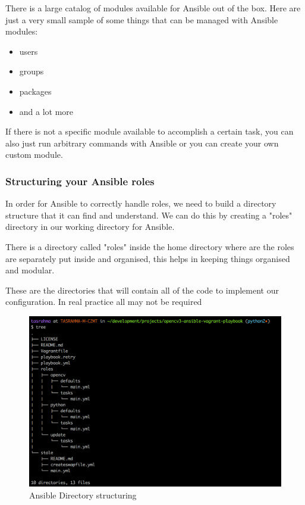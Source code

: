 \documentclass[BTech]{srmuthesis}
\begin{document}
There is a large catalog of modules available for Ansible out of the box. Here are just a very small sample of some things that can be managed with Ansible modules:

\begin{itemize}
    \item users
    \item groups
    \item packages
    \item and a lot more
\end{itemize}

If there is not a specific module available to accomplish a certain task, you can also just run arbitrary commands with Ansible or you can create your own custom module.

\subsubsection{Structuring your Ansible roles}

In order for Ansible to correctly handle roles, we need to build a directory structure that it can find and understand. We can do this by creating a "roles" directory in our working directory for Ansible.

There is a directory called "roles" inside the home directory where are the roles are separately put inside and organised, this helps in keeping things organised and modular.

These are the directories that will contain all of the code to implement our configuration. In real practice all may not be required 

\begin{figure}[h]
    \centering
    \includegraphics[width=15cm\textwidth]{opencv-ansible-play}
    \caption{Ansible Directory structuring}
    \label{fig:Ansible Directory structuring}
\end{figure}
\end{document}

